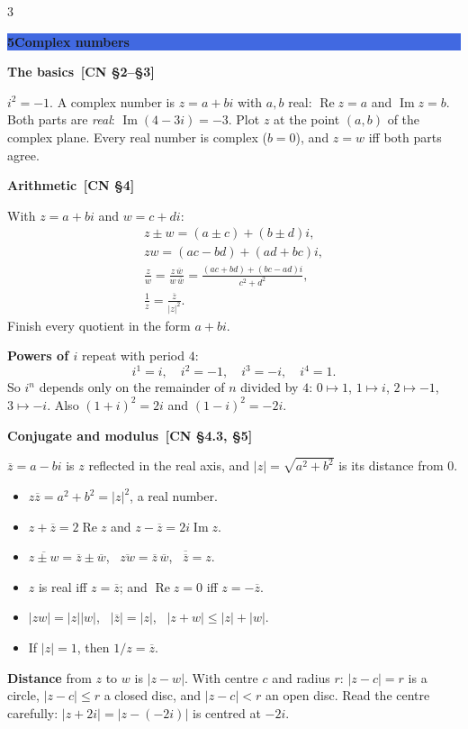 \documentclass[8pt]{extarticle}
\newcommand{\sect}[2]{\par\vspace{4pt}\noindent
  \colorbox{RoyalBlue}{\parbox{\dimexpr\linewidth-2\fboxsep}{%
    \color{white}\bfseries\sffamily\normalsize #1\enspace #2}}\par\vspace{2pt}}
\newcommand{\sub}[1]{\par\vspace{3pt}\noindent
  {\color{RoyalBlue}\bfseries\sffamily #1}\par\vspace{0.5pt}}
\newcommand{\src}[1]{{\color{gray}\,[#1]}}
\newcommand{\conj}[1]{\overline{#1}}
\newcommand{\Rez}{\operatorname{Re}}
\newcommand{\Imz}{\operatorname{Im}}
\begin{document}
\begin{multicols*}{3}
\sect{5}{Complex numbers}
\sub{The basics \src{CN \S2--\S3}}
$i^{2}=-1$. A complex number is $z=a+bi$ with $a,b$ real:
$\Rez z=a$ and $\Imz z=b$. Both parts are \emph{real}:
$\Imz(4-3i)=-3$. Plot $z$ at the point $(a,b)$ of the complex plane. Every
real number is complex ($b=0$), and $z=w$ iff both parts agree.

\sub{Arithmetic \src{CN \S4}}
With $z=a+bi$ and $w=c+di$:
\begin{gather*}
  z\pm w=(a\pm c)+(b\pm d)i,\\
  zw=(ac-bd)+(ad+bc)i,\\
  \frac zw=\frac{z\,\conj{w}}{w\,\conj{w}}
  =\frac{(ac+bd)+(bc-ad)i}{c^{2}+d^{2}},\\
  \frac1z=\frac{\conj{z}}{\lvert z\rvert^{2}} .
\end{gather*}
Finish every quotient in the form $a+bi$.

\textbf{Powers of $i$} repeat with period $4$:
\[
  i^{1}=i,\quad i^{2}=-1,\quad i^{3}=-i,\quad i^{4}=1 .
\]
So $i^{n}$ depends only on the remainder of $n$ divided by $4$:
$0\mapsto1$, $1\mapsto i$, $2\mapsto-1$, $3\mapsto-i$. Also
$(1+i)^{2}=2i$ and $(1-i)^{2}=-2i$.

\sub{Conjugate and modulus \src{CN \S4.3, \S5}}
$\conj{z}=a-bi$ is $z$ reflected in the real axis, and
$\lvert z\rvert=\sqrt{a^{2}+b^{2}}$ is its distance from $0$.
\begin{itemize}
  \item $z\conj{z}=a^{2}+b^{2}=\lvert z\rvert^{2}$, a real number.
  \item $z+\conj{z}=2\Rez z$ and $z-\conj{z}=2i\Imz z$.
  \item $\conj{z\pm w}=\conj{z}\pm\conj{w}$, \
        $\conj{zw}=\conj{z}\,\conj{w}$, \ $\conj{\conj{z}}=z$.
  \item $z$ is real iff $z=\conj{z}$; and $\Rez z=0$ iff $z=-\conj{z}$.
  \item $\lvert zw\rvert=\lvert z\rvert\lvert w\rvert$, \
        $\lvert\conj{z}\rvert=\lvert z\rvert$, \
        $\lvert z+w\rvert\le\lvert z\rvert+\lvert w\rvert$.
  \item If $\lvert z\rvert=1$, then $1/z=\conj{z}$.
\end{itemize}
\textbf{Distance} from $z$ to $w$ is $\lvert z-w\rvert$. With centre $c$ and
radius $r$: $\lvert z-c\rvert=r$ is a circle, $\lvert z-c\rvert\le r$ a closed
disc, and $\lvert z-c\rvert<r$ an open disc. Read the centre carefully:
$\lvert z+2i\rvert=\lvert z-(-2i)\rvert$ is centred at $-2i$.


\end{multicols*}
\end{document}
